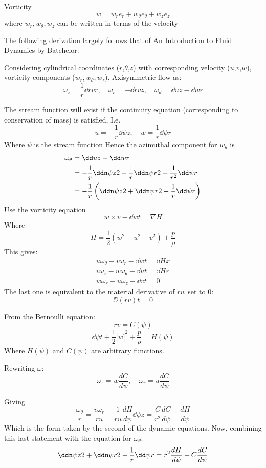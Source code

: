 \documentclass{X:/Documents/Coding/Latex/myreport}
\begin{document}
Vorticity
\[w = w_re_r + w_\theta e_\theta + w_ze_z\]
where $w_r, w_\theta, w_z$ can be written in terms of the velocity


The following derivation largely follows that of An Introduction to Fluid Dynamics by Batchelor:

Considering cylindrical coordinates ($r$,$\theta$,$z$) with corresponding velocity ($u$,$v$,$w$), vorticity components ($w_r,w_\theta,w_z$). Axisymmetric flow as:
\[\omega_z = \frac1r \dd{rv}{r}, \quad \omega_r = -\dd{rv}{z},\quad \omega_\theta = \dd{u}{z} - \dd{w}{r}\]

The stream function will exist if the continuity equation (corresponding to conservation of mass) is satisfied, I.e. 
\[ u=-\frac1r \dd\psi{z}, \quad w =\frac1r \dd\psi{r} \]
Where $\psi$ is the stream function
Hence the azimuthal component for $w_\theta$ is
\begin{align*}
    \omega_\theta &= \dd uz - \dd wr\\
    &= -\frac1r \ddn\psi z2 - \frac1r \ddn \psi r2 + \frac{1}{r^2} \dd\psi r\\
    &= -\frac1r\left(\ddn\psi z2 + \ddn \psi r2 - \frac1r\dd\psi r\right)
\end{align*}
Use the vorticity equation
\[w \times v - \dd wt = \nabla H\]
Where 
\[H = \frac12 (w^2 + u^2 + v^2) + \frac p\rho \]
This gives:
\begin{align*}
    u\omega_\theta - v\omega_r - \dd wt = \dd Hx\\
    v \omega_z - w \omega_\theta - \dd ut = \dd Hr\\
    w\omega_r - u \omega_z - \dd vt = 0
\end{align*}
The last one is equivalent to the material derivative of $rw$ set to 0:
\[\DD{(rv)}{t} = 0\]

From the Bernoulli equation:
\[rv = C(\psi)\]
\[\dd{\psi}{t} + \frac12 |\vec w|^2 + \frac{p}{\rho} = H(\psi)\]
Where $H(\psi)$ and $C(\psi)$ are arbitrary functions.

Rewriting $\omega$:
\[\omega_z = w \frac{dC}{d\psi}, \quad \omega_r = u \frac{dC}{d\psi}\]
 

Giving
\[\frac{\omega_\theta}{r} = \frac{v\omega_r}{ru} + \frac1{ru}\frac{dH}{d\psi} \dd\psi z = \frac{C}{r^2} \frac{dC}{d\psi} - \frac{dH}{d\psi}\]
Which is the form taken by the second of the dynamic equations.
Now, combining this last statement with the equation for $\omega_\theta$:
\[\ddn \psi z 2 + \ddn \psi r2 - \frac1r \dd\psi r= r^2 \frac{dH}{d\psi} - C\frac{dC}{d\psi}\]
\end{document}
